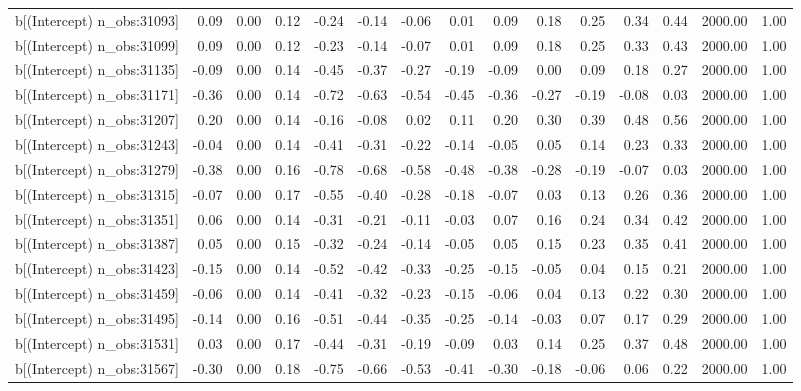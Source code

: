 \begin{table}[ht]
\begin{tabular}{rrrrrrrrrrrrrrr}
  b[(Intercept) n\_obs:31093] & 0.09 & 0.00 & 0.12 & -0.24 & -0.14 & -0.06 & 0.01 & 0.09 & 0.18 & 0.25 & 0.34 & 0.44 & 2000.00 & 1.00 \\ 
  b[(Intercept) n\_obs:31099] & 0.09 & 0.00 & 0.12 & -0.23 & -0.14 & -0.07 & 0.01 & 0.09 & 0.18 & 0.25 & 0.33 & 0.43 & 2000.00 & 1.00 \\ 
  b[(Intercept) n\_obs:31135] & -0.09 & 0.00 & 0.14 & -0.45 & -0.37 & -0.27 & -0.19 & -0.09 & 0.00 & 0.09 & 0.18 & 0.27 & 2000.00 & 1.00 \\ 
  b[(Intercept) n\_obs:31171] & -0.36 & 0.00 & 0.14 & -0.72 & -0.63 & -0.54 & -0.45 & -0.36 & -0.27 & -0.19 & -0.08 & 0.03 & 2000.00 & 1.00 \\ 
  b[(Intercept) n\_obs:31207] & 0.20 & 0.00 & 0.14 & -0.16 & -0.08 & 0.02 & 0.11 & 0.20 & 0.30 & 0.39 & 0.48 & 0.56 & 2000.00 & 1.00 \\ 
  b[(Intercept) n\_obs:31243] & -0.04 & 0.00 & 0.14 & -0.41 & -0.31 & -0.22 & -0.14 & -0.05 & 0.05 & 0.14 & 0.23 & 0.33 & 2000.00 & 1.00 \\ 
  b[(Intercept) n\_obs:31279] & -0.38 & 0.00 & 0.16 & -0.78 & -0.68 & -0.58 & -0.48 & -0.38 & -0.28 & -0.19 & -0.07 & 0.03 & 2000.00 & 1.00 \\ 
  b[(Intercept) n\_obs:31315] & -0.07 & 0.00 & 0.17 & -0.55 & -0.40 & -0.28 & -0.18 & -0.07 & 0.03 & 0.13 & 0.26 & 0.36 & 2000.00 & 1.00 \\ 
  b[(Intercept) n\_obs:31351] & 0.06 & 0.00 & 0.14 & -0.31 & -0.21 & -0.11 & -0.03 & 0.07 & 0.16 & 0.24 & 0.34 & 0.42 & 2000.00 & 1.00 \\ 
  b[(Intercept) n\_obs:31387] & 0.05 & 0.00 & 0.15 & -0.32 & -0.24 & -0.14 & -0.05 & 0.05 & 0.15 & 0.23 & 0.35 & 0.41 & 2000.00 & 1.00 \\ 
  b[(Intercept) n\_obs:31423] & -0.15 & 0.00 & 0.14 & -0.52 & -0.42 & -0.33 & -0.25 & -0.15 & -0.05 & 0.04 & 0.15 & 0.21 & 2000.00 & 1.00 \\ 
  b[(Intercept) n\_obs:31459] & -0.06 & 0.00 & 0.14 & -0.41 & -0.32 & -0.23 & -0.15 & -0.06 & 0.04 & 0.13 & 0.22 & 0.30 & 2000.00 & 1.00 \\ 
  b[(Intercept) n\_obs:31495] & -0.14 & 0.00 & 0.16 & -0.51 & -0.44 & -0.35 & -0.25 & -0.14 & -0.03 & 0.07 & 0.17 & 0.29 & 2000.00 & 1.00 \\ 
  b[(Intercept) n\_obs:31531] & 0.03 & 0.00 & 0.17 & -0.44 & -0.31 & -0.19 & -0.09 & 0.03 & 0.14 & 0.25 & 0.37 & 0.48 & 2000.00 & 1.00 \\ 
  b[(Intercept) n\_obs:31567] & -0.30 & 0.00 & 0.18 & -0.75 & -0.66 & -0.53 & -0.41 & -0.30 & -0.18 & -0.06 & 0.06 & 0.22 & 2000.00 & 1.00 \\ 

\end{tabular}
\end{table}
